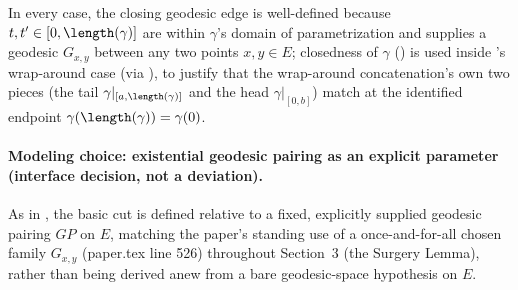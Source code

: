 \begin{definition}
  In every case, the closing geodesic edge is well-defined because $t,t' \in [0,\length(\gamma)]$
  are within $\gamma$'s domain of parametrization and  supplies a geodesic
  $G_{x,y}$ between any two points $x,y \in E$; closedness of $\gamma$ () is
  used inside 's wrap-around case (via ), to justify
  that the wrap-around concatenation's own two pieces (the tail $\gamma|_{[a,\length(\gamma)]}$ and
  the head $\gamma|_{[0,b]}$) match at the identified endpoint $\gamma(\length(\gamma))=\gamma(0)$.

  \paragraph{Modeling choice: existential geodesic pairing as an explicit parameter (interface
  decision, not a deviation).} As in , the basic cut is defined relative to
  a fixed, explicitly supplied geodesic pairing $GP$ on $E$, matching the paper's standing use of a
  once-and-for-all chosen family $G_{x,y}$ (paper.tex line 526) throughout Section~3 (the Surgery
  Lemma), rather than being derived anew from a bare geodesic-space hypothesis on $E$.
\end{definition}
